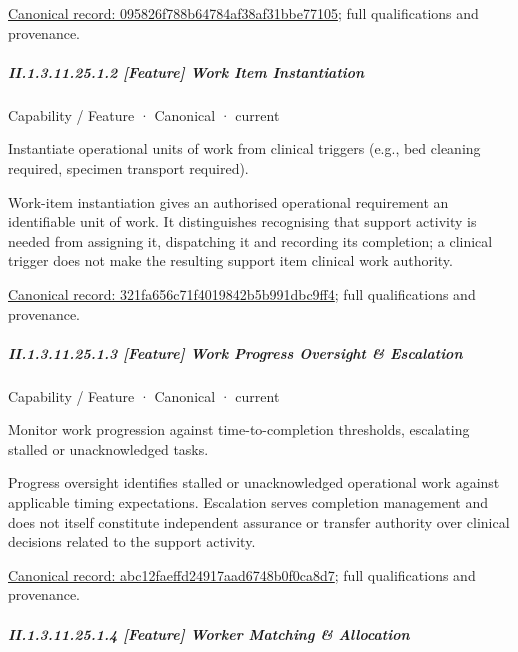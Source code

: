 {\footnotesize \href{../../../../continuum/strategy/capability/feature/095826f788b64784af38af31bbe77105.md}{Canonical record: 095826f788b64784af38af31bbe77105}; full qualifications and provenance.}\par
\subparagraph*{II.1.3.11.25.1.2 [Feature] Work Item Instantiation}
\label{navigation:II.1.3.11.25.1.2}

\label{element:321fa656c71f4019842b5b991dbc9ff4}
{\small Capability / Feature · Canonical · current}\par

Instantiate operational units of work from clinical triggers (e.g., bed cleaning required, specimen transport required).



Work-item instantiation gives an authorised operational requirement an identifiable unit of work. It distinguishes recognising that support activity is needed from assigning it, dispatching it and recording its completion; a clinical trigger does not make the resulting support item clinical work authority.


{\footnotesize \href{../../../../continuum/strategy/capability/feature/321fa656c71f4019842b5b991dbc9ff4.md}{Canonical record: 321fa656c71f4019842b5b991dbc9ff4}; full qualifications and provenance.}\par
\subparagraph*{II.1.3.11.25.1.3 [Feature] Work Progress Oversight \& Escalation}
\label{navigation:II.1.3.11.25.1.3}

\label{element:abc12faeffd24917aad6748b0f0ca8d7}
{\small Capability / Feature · Canonical · current}\par

Monitor work progression against time-to-completion thresholds, escalating stalled or unacknowledged tasks.



Progress oversight identifies stalled or unacknowledged operational work against applicable timing expectations. Escalation serves completion management and does not itself constitute independent assurance or transfer authority over clinical decisions related to the support activity.


{\footnotesize \href{../../../../continuum/strategy/capability/feature/abc12faeffd24917aad6748b0f0ca8d7.md}{Canonical record: abc12faeffd24917aad6748b0f0ca8d7}; full qualifications and provenance.}\par
\subparagraph*{II.1.3.11.25.1.4 [Feature] Worker Matching \& Allocation}
\label{navigation:II.1.3.11.25.1.4}

